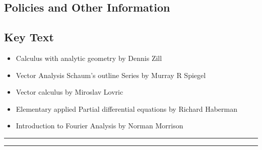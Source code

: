 
\subsection*{Policies and Other Information}
\subsection*{Key Text}
\begin{itemize}
    \item Calculus with analytic geometry by Dennis Zill
    \item Vector Analysis Schaum’s outline Series by Murray R Spiegel
    \item Vector calculus by Miroslav Lovric
    \item Elementary applied Partial differential equations by Richard Haberman
    \item Introduction to Fourier Analysis by Norman Morrison
\end{itemize}
\vspace{2ex}\hrule
\vspace{2ex}\hrule\vspace{2ex}